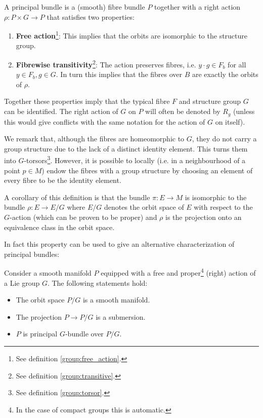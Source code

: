     \begin{definition}
        A principal bundle is a (smooth) fibre bundle $P$ together with a right action $\rho:P\times G\rightarrow P$ that satisfies two properties:
        \begin{enumerate}
            \item \textbf{Free action}\footnote{See definition \ref{group:free_action}.}: This implies that the orbits are isomorphic to the structure group.
            \item \textbf{Fibrewise transitivity}\footnote{See definition \ref{group:transitive}.}: The action preserves fibres, i.e. $y\cdot g\in F_b$ for all $y\in F_b, g\in G$. In turn this implies that the fibres over $B$ are exactly the orbits of $\rho$.
        \end{enumerate}
        Together these properties imply that the typical fibre $F$ and structure group $G$ can be identified. The right action of $G$ on $P$ will often be denoted by $R_g$ (unless this would give conflicts with the same notation for the action of $G$ on itself).
    \end{definition}
    \begin{remark}[$G$-torsor]\label{diff:fibre_torsor}
        We remark that, although the fibres are homeomorphic to $G$, they do not carry a group structure due to the lack of a distinct identity element. This turns them into $G$-torsors\footnote{See definition \ref{group:torsor}.}. However, it is possible to locally (i.e. in a neighbourhood of a point $p\in M$) endow the fibres with a group structure by choosing an element of every fibre to be the identity element.
    \end{remark}
    \begin{property}
        A corollary of this definition is that the bundle $\pi:E\rightarrow M$ is isomorphic to the bundle $\rho:E\rightarrow E/G$ where $E/G$ denotes the orbit space of $E$ with respect to the $G$-action (which can be proven to be proper) and $\rho$ is the projection onto an equivalence class in the orbit space.
    \end{property}
    In fact this property can be used to give an alternative characterization of principal bundles:
    \begin{property}
        Consider a smooth manifold $P$ equipped with a free and proper\footnote{In the case of compact groups this is automatic.} (right) action of a Lie group $G$. The following statements hold:
        \begin{itemize}
            \item The orbit space $P/G$ is a smooth manifold.
            \item The projection $P\rightarrow P/G$ is a submersion.
            \item $P$ is principal $G$-bundle over $P/G$.
        \end{itemize}
    \end{property}

